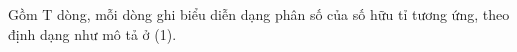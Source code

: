 Gồm T dòng, mỗi dòng ghi biểu diễn dạng phân số của số hữu tỉ tương ứng, theo định dạng như mô tả ở (1).